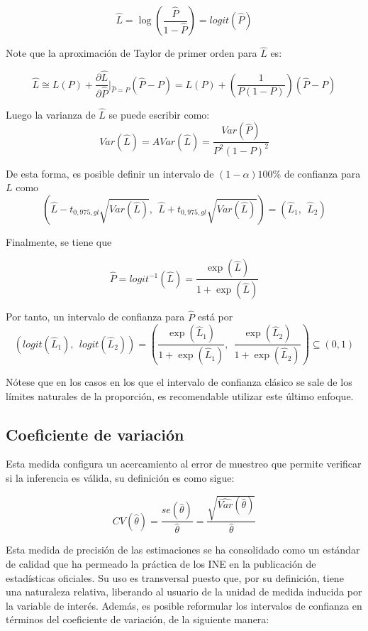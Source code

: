 \documentclass[
  12pt,
]{book}
\begin{document}
\[
\hat{L} = \log \left(\dfrac{\hat{P}}{1-\hat{P}} \right) = logit(\hat{P})
\]

Note que la aproximación de Taylor de primer orden para \(\hat{L}\) es:

\[
\hat{L} \cong L(P) + \frac{\partial \hat{L}}{\partial \hat{P}}\biggr\rvert_{\hat{P}=P}(\hat{P}-P) = L(P) + \left( \dfrac{1}{P(1-P)}\right)(\hat{P}-P)
\]

Luego la varianza de \(\hat{L}\) se puede escribir como:
\[
Var(\hat{L}) = AVar(\hat{L}) = \dfrac{Var(\hat{P})}{P^2(1-P)^2}
\]

De esta forma, es posible definir un intervalo de \((1-\alpha)100\%\) de confianza para \(L\) como
\[
\left(\hat{L} - t_{0,975, gl}\sqrt{Var(\hat{L})}, \ \
\hat{L} + t_{0,975, gl}\sqrt{Var(\hat{L})}
\right) =
(\hat{L}_1, \ \ \hat{L}_2)
\]

Finalmente, se tiene que

\[
\hat{P} = logit^{-1}(\hat L) = \dfrac{\exp (\hat{L})}{1+\exp (\hat{L})}
\]

Por tanto, un intervalo de confianza para \(\hat{P}\) está por
\[
\left(logit(\hat{L}_1), \ \ logit(\hat{L}_2)\right) = 
\left(
\dfrac{\exp (\hat{L}_1)}{1+\exp (\hat{L}_1)}, \ \
\dfrac{\exp (\hat{L}_2)}{1+\exp (\hat{L}_2)}
\right) \subseteq (0, 1)
\]

Nótese que en los casos en los que el intervalo de confianza clásico se sale de los límites naturales de la proporción, es recomendable utilizar este último enfoque.

\hypertarget{coeficiente-de-variaciuxf3n}{%
\subsection{Coeficiente de variación}\label{coeficiente-de-variaciuxf3n}}

Esta medida configura un acercamiento al error de muestreo que permite verificar si la inferencia es válida, su definición es como sigue:

\[
CV(\hat\theta) = \frac{se(\hat\theta)}{\hat\theta} = \frac{\sqrt{\widehat{Var}(\hat\theta)}}{\hat\theta}
\]

Esta medida de precisión de las estimaciones se ha consolidado como un estándar de calidad que ha permeado la práctica de los INE en la publicación de estadísticas oficiales. Su uso es transversal puesto que, por su definición, tiene una naturaleza relativa, liberando al usuario de la unidad de medida inducida por la variable de interés. Además, es posible reformular los intervalos de confianza en términos del coeficiente de variación, de la siguiente manera:
\end{document}
